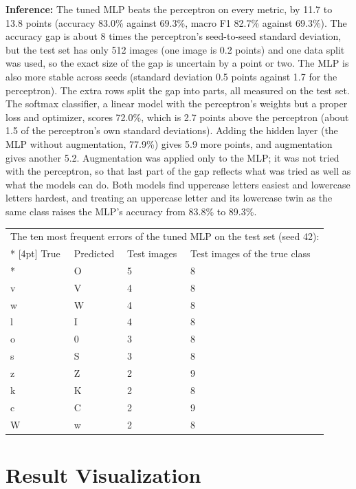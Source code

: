 \documentclass[12pt,a4paper]{article}
\begin{document}
\textbf{Inference:} The tuned MLP beats the perceptron on every metric, by 11.7 to
13.8 points (accuracy 83.0\% against
69.3\%, macro F1 82.7\% against
69.3\%). The accuracy gap is about 8 times the perceptron's
seed-to-seed standard deviation, but the test set has only 512 images (one image is 0.2 points) and
one data split was used, so the exact size of the gap is uncertain by a point or two. The MLP is also
more stable across seeds (standard deviation 0.5 points against
1.7 for the perceptron). The extra rows split the gap into parts, all
measured on the test set. The softmax classifier, a linear model with the perceptron's weights but a
proper loss and optimizer, scores 72.0\%, which is
2.7 points above the perceptron (about
1.5 of the perceptron's own standard deviations). Adding the hidden layer (the MLP without
augmentation, 77.9\%) gives
5.9 more points, and augmentation
gives another 5.2. Augmentation was applied
only to the MLP; it was not tried with the perceptron, so that last part of the gap reflects what was
tried as well as what the models can do. Both models find uppercase letters easiest and lowercase
letters hardest, and treating an uppercase letter and its lowercase twin as the same class raises the
MLP's accuracy from 83.8\% to 89.3\%.

{\small\setlength{\tabcolsep}{4pt}
\begin{longtable}{p{1.6cm}p{2.2cm}p{2.6cm}p{4.0cm}}
\multicolumn{4}{l}{\parbox[t]{14.5cm}{The ten most frequent errors of the tuned MLP on the test set (seed 42):}} \\*
[4pt]
\toprule
True & Predicted & Test images & Test images of the true class \\*
\midrule
0 & O & 5 & 8 \\
v & V & 4 & 8 \\
w & W & 4 & 8 \\
l & I & 4 & 8 \\
o & 0 & 3 & 8 \\
s & S & 3 & 8 \\
z & Z & 2 & 9 \\
k & K & 2 & 8 \\
c & C & 2 & 9 \\
W & w & 2 & 8 \\
\bottomrule
\end{longtable}
}

\section{Result Visualization}
\end{document}
